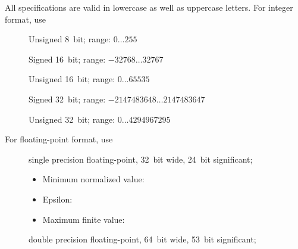 \begin{codelist}
  All  specifications are valid in lowercase as well as
  uppercase letters.  For integer format, use

  \begin{description}
  \item[]\itemend
    Unsigned 8~bit; range: $0\dots255$

  \item[]\itemend
    Signed 16~bit; range: $-32768\dots32767$

  \item[]\itemend
    Unsigned 16~bit; range: $0\dots65535$

  \item[]\itemend
    Signed 32~bit; range: $-2147483648\dots2147483647$

  \item[]\itemend
    Unsigned 32~bit; range: $0\dots4294967295$
  \end{description}

  For floating-point format, use

  \begin{description}
  \item[]\itemend
    single
    precision floating-point, 32~bit wide, 24~bit
    significant;

    \begin{itemize}
    \item
      Minimum normalized value: 
    \item
      Epsilon: 
    \item
      Maximum finite value: 
    \end{itemize}

  \item[]\itemend
    double
    precision floating-point, 64~bit wide, 53~bit
    significant;


\end{description}
\end{codelist}
